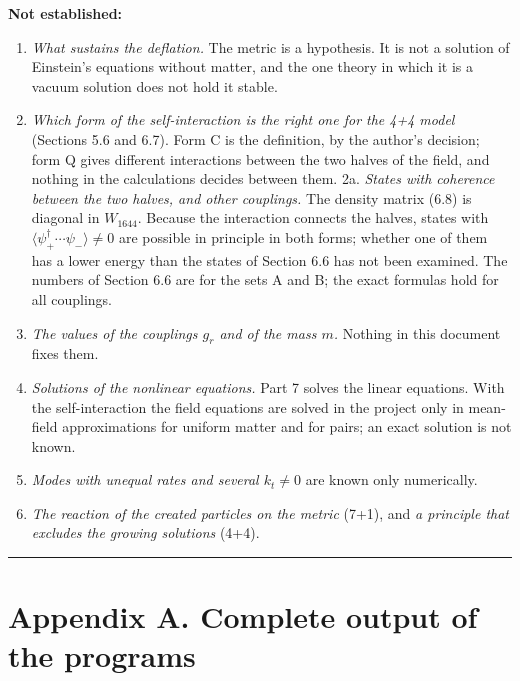 \documentclass[
  10pt,
]{article}
\providecommand{\tightlist}{%
  \setlength{\itemsep}{0pt}\setlength{\parskip}{0pt}}
\begin{document}
\textbf{Not established:}

\begin{enumerate}
\def\labelenumi{\arabic{enumi}.}
\tightlist
\item
  \emph{What sustains the deflation.} The metric is a hypothesis. It is
  not a solution of Einstein's equations without matter, and the one
  theory in which it is a vacuum solution does not hold it stable.
\item
  \emph{Which form of the self-interaction is the right one for the 4+4
  model} (Sections 5.6 and 6.7). Form C is the definition, by the
  author's decision; form Q gives different interactions between the two
  halves of the field, and nothing in the calculations decides between
  them. 2a. \emph{States with coherence between the two halves, and
  other couplings.} The density matrix (6.8) is diagonal in
  \(W_{1644}\). Because the interaction connects the halves, states with
  \(\langle\psi_+^\dagger\cdots\psi_-\rangle\neq0\) are possible in
  principle in both forms; whether one of them has a lower energy than
  the states of Section 6.6 has not been examined. The numbers of
  Section 6.6 are for the sets A and B; the exact formulas hold for all
  couplings.
\item
  \emph{The values of the couplings \(g_r\) and of the mass \(m\).}
  Nothing in this document fixes them.
\item
  \emph{Solutions of the nonlinear equations.} Part 7 solves the linear
  equations. With the self-interaction the field equations are solved in
  the project only in mean-field approximations for uniform matter and
  for pairs; an exact solution is not known.
\item
  \emph{Modes with unequal rates and several \(k_t\neq0\)} are known
  only numerically.
\item
  \emph{The reaction of the created particles on the metric} (7+1), and
  \emph{a principle that excludes the growing solutions} (4+4).
\end{enumerate}

\begin{center}\rule{0.5\linewidth}{0.5pt}\end{center}

\hypertarget{appendix-a.-complete-output-of-the-programs}{%
\section{Appendix A. Complete output of the
programs}\label{appendix-a.-complete-output-of-the-programs}}
\end{document}
